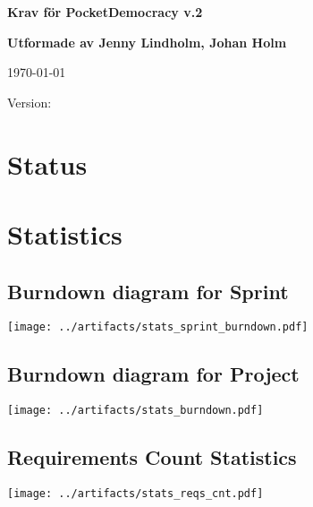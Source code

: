 \documentclass{report}
\begin{document}
\thispagestyle{empty}

\mbox{}

\vfill

{\LARGE\textbf{Krav för PocketDemocracy v.2}}

\vfill

{\Large\textbf{Utformade av Jenny Lindholm, Johan Holm}}

\vfill

\today

\vfill

Version: 

\vfill

\newpage

\tableofcontents

\newpage

\chapter{Status}




\chapter{Statistics}
\section{Burndown diagram for Sprint}
\texttt{[image: ../artifacts/stats\_sprint\_burndown.pdf]}

\section{Burndown diagram for Project}
\texttt{[image: ../artifacts/stats\_burndown.pdf]}

\section{Requirements Count Statistics}
\texttt{[image: ../artifacts/stats\_reqs\_cnt.pdf]}
\end{document}
